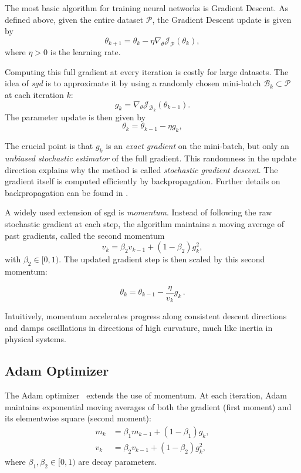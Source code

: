 The most basic algorithm for training neural networks is Gradient Descent. As defined above, given the entire dataset $\mathcal{P}$, the Gradient Descent update is given by
\begin{equation*}
    \theta_{k+1} = \theta_k - \eta \nabla_\theta \mathcal{J}_{\mathcal{P}}(\theta_k), 
\end{equation*}
where $\eta>0$ is the learning rate.

Computing this full gradient at every iteration is costly for large
datasets. The idea of \emph{\acl{sgd}} is to approximate it by using a randomly
chosen mini-batch $\mathcal{B}_k \subset \mathcal{P}$ at each iteration $k$:
$$
    g_k = \nabla_\theta \mathcal{J}_{\mathcal{B}_k}(\theta_{k-1}).
$$
The parameter update is then given by
$$
    \theta_k = \theta_{k-1} - \eta g_k,
$$


The crucial point is that $g_k$ is an \emph{exact gradient} on the mini-batch,
but only an \emph{unbiased stochastic estimator} of the full gradient. This
randomness in the update direction explains why the method is called
\emph{stochastic gradient descent}. The gradient itself is computed efficiently
by backpropagation. Further details on backpropagation can be found in
\cite[Section~6.5]{goodfellow2016deep}.

A widely used extension of \ac{sgd} is \emph{momentum}. Instead of following the
raw stochastic gradient at each step, the algorithm maintains a moving average
of past gradients, called the second momentum
$$
    v_k = \beta_2 v_{k-1} + (1-\beta_2) g_k^2,
$$
with $\beta_2 \in [0,1)$. The updated gradient step is then scaled by this
second momentum:

$$
    \theta_k = \theta_{k-1} - \frac{\eta}{v_k}g_k\,.
$$

Intuitively, momentum accelerates progress along consistent descent directions
and damps oscillations in directions of high curvature, much like inertia in
physical systems.

\subsection{Adam Optimizer}

The Adam optimizer~\cite[Section~8.5]{goodfellow2016deep} extends the use of
momentum. At each iteration, Adam maintains exponential moving averages of both
the gradient (first moment) and its elementwise square (second moment):
\begin{align*}
    m_k &= \beta_1 m_{k-1} + (1-\beta_1) g_k, \\
    v_k &= \beta_2 v_{k-1} + (1-\beta_2) g_k^2,
\end{align*}
where $\beta_1,\beta_2\in[0,1)$ are decay parameters.

